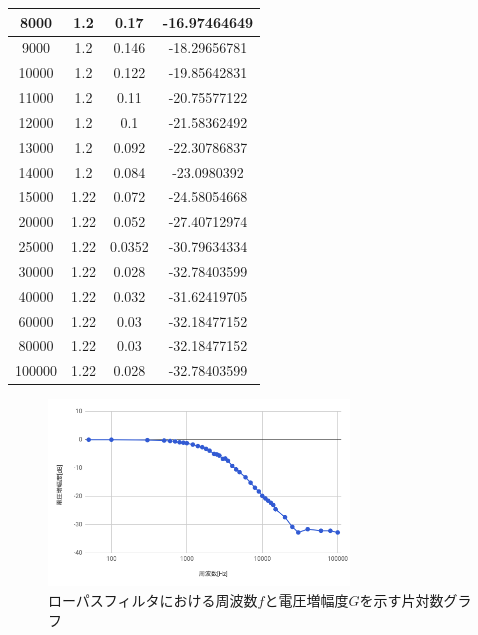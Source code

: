 \documentclass[a4paper,11pt,uplatex]{jsarticle}
\begin{document}
\begin{table}[H]
\begin{center}
\begin{tabular}[H]{|c|c|c|c|}
      8000 & 1.2 & 0.17 & -16.97464649 \\ \hline
      9000 & 1.2 & 0.146 & -18.29656781 \\ \hline
      10000 & 1.2 & 0.122 & -19.85642831 \\ \hline
      11000 & 1.2 & 0.11 & -20.75577122 \\ \hline
      12000 & 1.2 & 0.1 & -21.58362492 \\ \hline
      13000 & 1.2 & 0.092 & -22.30786837 \\ \hline
      14000 & 1.2 & 0.084 & -23.0980392 \\ \hline
      15000 & 1.22 & 0.072 & -24.58054668 \\ \hline
      20000 & 1.22 & 0.052 & -27.40712974 \\ \hline
      25000 & 1.22 & 0.0352 & -30.79634334 \\ \hline
      30000 & 1.22 & 0.028 & -32.78403599 \\ \hline
      40000 & 1.22 & 0.032 & -31.62419705 \\ \hline
      60000 & 1.22 & 0.03 & -32.18477152 \\ \hline
      80000 & 1.22 & 0.03 & -32.18477152 \\ \hline
      100000 & 1.22 & 0.028 & -32.78403599 \\ \hline
    \end{tabular}
\end{center}
\end{table}

\begin{figure}[H]
	\begin{center}
		\includegraphics[width=8cm]{画像/ローパス対数.png}
		\caption{ローパスフィルタにおける周波数$f$と電圧増幅度$G$を示す片対数グラフ}
		\label{ローパス片対数}
	\end{center}
\end{figure}
\end{document}
